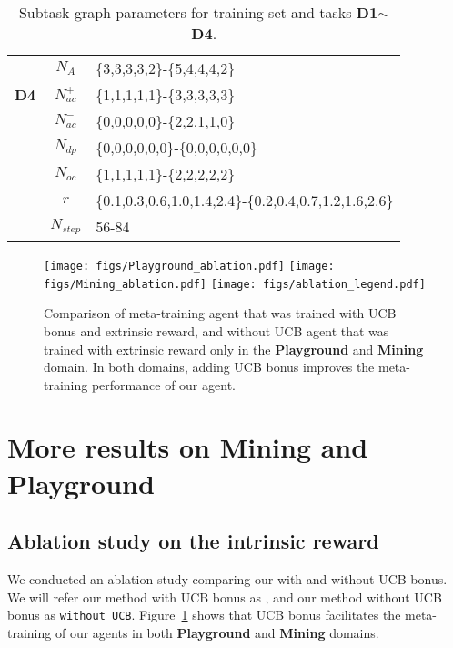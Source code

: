 \documentclass{article} \usepackage{iclr2020_conference,times}
\newcommand{\tb}{\textbf}
\begin{document}
\begin{table*}[!hbt]
\begin{tabular}{r|c|l}
      & $N_A$       & \{3,3,3,3,2\}-\{5,4,4,4,2\}\\
\tb{D4}& $N_{ac}^{+}$& \{1,1,1,1,1\}-\{3,3,3,3,3\}\\ 
      & $N_{ac}^{-}$& \{0,0,0,0,0\}-\{2,2,1,1,0\}\\
      & $N_{dp}$      &\{0,0,0,0,0,0\}-\{0,0,0,0,0,0\}\\
      & $N_{oc}$      &\{1,1,1,1,1\}-\{2,2,2,2,2\}\\
      & $r$       &\{0.1,0.3,0.6,1.0,1.4,2.4\}-\{0.2,0.4,0.7,1.2,1.6,2.6\}\\
      & $N_{step}$  &56-84\\
  \hline
  \end{tabular}
\vspace{-2pt}
\caption{Subtask graph parameters for training set and tasks \tb{D1}$\sim$\tb{D4}.}
\label{tb:graph_param}
\end{table*}
\fi



\FloatBarrier


\begin{figure}[!thp]
    \centering
    \texttt{[image: figs/Playground\_ablation.pdf]}
    \texttt{[image: figs/Mining\_ablation.pdf]}
    \texttt{[image: figs/ablation\_legend.pdf]}
    \caption{Comparison of meta-training \NSGIMeta agent that was trained with UCB bonus and extrinsic reward, and \NSGIMeta without UCB agent that was trained with extrinsic reward only in the \tb{Playground} and \tb{Mining} domain. In both domains, adding UCB bonus improves the meta-training performance of our \NSGIMeta agent.
    }
    \label{fig:appendix-ablation}
\end{figure}


\section{More results on Mining and Playground}

\subsection{Ablation study on the intrinsic reward}
\label{sec:appendix_ablation}
We conducted an ablation study comparing our \NSGIMeta with and without UCB bonus. We will refer our method with UCB bonus as \NSGIMeta, and our method without UCB bonus as \NSGIMeta \texttt{without UCB}.
Figure~\ref{fig:appendix-ablation} shows that UCB bonus facilitates the meta-training of our \NSGIMeta agents in both \tb{Playground} and \tb{Mining} domains.
\end{document}
